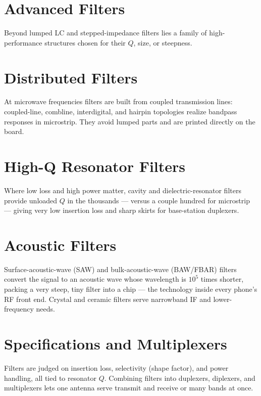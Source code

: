 \section{Advanced Filters}\label{sec:tb_adv_filters}



Beyond lumped LC and stepped-impedance filters lies a family of high-performance
structures chosen for their $Q$, size, or steepness.

\section{Distributed Filters}
At microwave frequencies filters are built from coupled transmission lines:
coupled-line, combline, interdigital, and hairpin topologies realize bandpass
responses in microstrip. They avoid lumped parts and are printed directly on the
board.

\section{High-Q Resonator Filters}
Where low loss and high power matter, cavity and dielectric-resonator filters
provide unloaded $Q$ in the thousands --- versus a couple hundred for microstrip
--- giving very low insertion loss and sharp skirts for base-station duplexers.

\section{Acoustic Filters}
Surface-acoustic-wave (SAW) and bulk-acoustic-wave (BAW/FBAR) filters convert the
signal to an acoustic wave whose wavelength is $10^5$ times shorter, packing a
very steep, tiny filter into a chip --- the technology inside every phone's RF
front end. Crystal and ceramic filters serve narrowband IF and lower-frequency
needs.

\section{Specifications and Multiplexers}
Filters are judged on insertion loss, selectivity (shape factor), and power
handling, all tied to resonator $Q$. Combining filters into duplexers, diplexers,
and multiplexers lets one antenna serve transmit and receive or many bands at
once.




